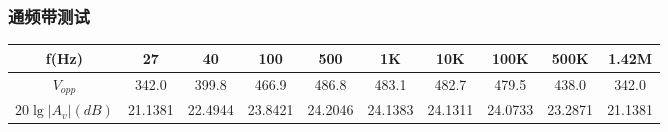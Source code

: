 \documentclass[a4paper]{article}
\theoremstyle{definition}
\theoremstyle{plain}
\theoremstyle{remark}
\begin{document}
\subsubsection{通频带测试}

\begin{table}[H]
	\centering
	\begin{tabular}{|c|c|c|c|c|c|c|c|c|c|}
		\hline
		f(Hz)                                  & 27      & 40      & 100     & 500     & 1K      & 10K     & 100K    & 500K    & 1.42M   \\ \hline
		$V_{opp}$                              & 342.0   & 399.8   & 466.9   & 486.8   & 483.1   & 482.7   & 479.5   & 438.0   & 342.0   \\ \hline
		$20\lg\left\vert A_v \right\vert (dB)$ & 21.1381 & 22.4944 & 23.8421 & 24.2046 & 24.1383 & 24.1311 & 24.0733 & 23.2871 & 21.1381 \\ \hline
	\end{tabular}
\end{table}
\end{document}
